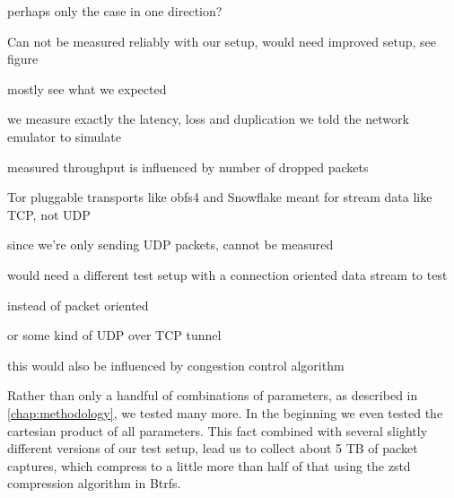perhaps only the case in one direction?

Can not be measured reliably with our setup, would need improved setup, see figure



mostly see what we expected

we measure exactly the latency, loss and duplication we told the network emulator to simulate

measured throughput is influenced by number of dropped packets


Tor pluggable transports like obfs4 and Snowflake
meant for stream data like TCP, not UDP

since we're only sending UDP packets, cannot be measured

would need a different test setup with a connection oriented data stream to test

instead of packet oriented

or some kind of UDP over TCP tunnel

this would also be influenced by congestion control algorithm


Rather than only a handful of combinations of parameters, as described in \cref{chap:methodology}, we tested many more.
In the beginning we even tested the cartesian product of all parameters.
This fact combined with several slightly different versions of our test setup, lead us to collect about 5 TB of packet captures, which compress to a little more than half of that using the zstd compression algorithm in Btrfs.
